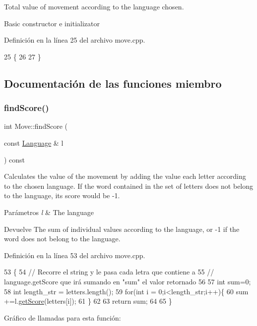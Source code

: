 Total value of movement according to the language chosen. 

Basic constructor e initializator 

Definición en la línea 25 del archivo move.\+cpp.


\begin{DoxyCode}
25                \{
26     
27 \}
\end{DoxyCode}


\subsection{Documentación de las funciones miembro}
\mbox{\label{classMove_aa6b05aeb84f41524a7da5e700d5d3bc6}} 
\subsubsection{\texorpdfstring{find\+Score()}{findScore()}}
{\footnotesize\ttfamily int Move\+::find\+Score (\begin{DoxyParamCaption}\item[{const \hyperlink{classLanguage}{Language} \&}]{l }\end{DoxyParamCaption}) const}



Calculates the value of the movement by adding the value each letter according to the chosen language. If the word contained in the set of letters does not belong to the language, its score would be -\/1. 


\begin{DoxyParams}{Parámetros}
{\em l} & The language \\
\hline
\end{DoxyParams}
\begin{DoxyReturn}{Devuelve}
The sum of individual values according to the language, or -\/1 if the word does not belong to the language. 
\end{DoxyReturn}


Definición en la línea 53 del archivo move.\+cpp.


\begin{DoxyCode}
53                                          \{
54     \textcolor{comment}{// Recorre el string y le pasa cada letra que contiene a }
55     \textcolor{comment}{// language.getScore que irá sumando en "sum" el valor retornado}
56     
57     \textcolor{keywordtype}{int} sum=0;
58     \textcolor{keywordtype}{int} length\_str = letters.length();
59     \textcolor{keywordflow}{for}(\textcolor{keywordtype}{int} i = 0;i<length\_str;i++)\{
60         sum +=l.\hyperlink{classLanguage_a02f7ca8ab721b358955c50df51de6df1}{getScore}(letters[i]);
61     \}
62     
63     \textcolor{keywordflow}{return} sum;
64 
65 \}
\end{DoxyCode}
Gráfico de llamadas para esta función\+:
\mbox{\label{classMove_aff2eaae186d0524aa616fe88ad844722}} 
